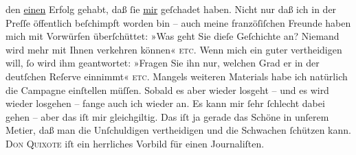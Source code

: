                den \uline{einen} Erfolg gehabt, daß ſie \uline{mir} geſchadet haben. Nicht nur daß ich in der Preſſe öffentlich
               beſchimpft worden bin – auch meine franzöſiſchen Freunde haben mich mit Vorwürfen überſchüttet: »Was geht Sie
               dieſe Geſchichte an? Niemand wird mehr mit Ihnen verkehren können« \textsc{etc.} Wenn mich ein guter {\pb}\label{K_L02786-5v}\label{K_L02786-5} vertheidigen will, ſo wird ihm geantwortet: »Fragen Sie ihn
               nur, welchen Grad er in der deutſchen Reſerve einnimmt« \textsc{etc}. Mangels weiteren
               Materials habe ich natürlich die Campagne einſtellen müſſen. Sobald es aber wieder
               losgeht – und es wird wieder losgehen – fange auch ich wieder an. Es kann mir ſehr
               ſchlecht dabei gehen – aber das iſt  mir
               gleichgiltig. Das iſt ja gerade das Schöne in unſerem Metier, daß {\pb}man die Unſchuldigen vertheidigen und die Schwachen
               ſchützen kann. \textsc{Don Quixote} iſt ein herrliches Vorbild für einen 
               Journaliſten.\pend
           
